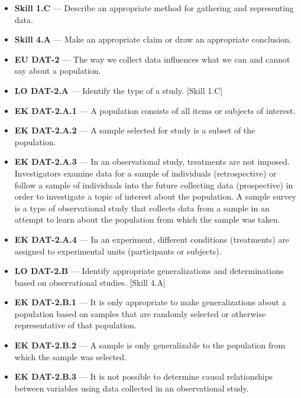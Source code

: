 \documentclass[11pt]{article}
\begin{document}


{\small
\begin{itemize}[leftmargin=1.5em,itemsep=2pt,topsep=2pt]
  \item \textbf{Skill 1.C} --- Describe an appropriate method for gathering and representing data.
  \item \textbf{Skill 4.A} --- Make an appropriate claim or draw an appropriate conclusion.
  \item \textbf{EU DAT-2} --- The way we collect data influences what we can and cannot say about a population.
  \item \textbf{LO DAT-2.A} --- Identify the type of a study. [Skill 1.C]
  \item \textbf{EK DAT-2.A.1} --- A population consists of all items or subjects of interest.
  \item \textbf{EK DAT-2.A.2} --- A sample selected for study is a subset of the population.
  \item \textbf{EK DAT-2.A.3} --- In an observational study, treatments are not imposed. Investigators examine data for a sample of individuals (retrospective) or follow a sample of individuals into the future collecting data (prospective) in order to investigate a topic of interest about the population. A sample survey is a type of observational study that collects data from a sample in an attempt to learn about the population from which the sample was taken.
  \item \textbf{EK DAT-2.A.4} --- In an experiment, different conditions (treatments) are assigned to experimental units (participants or subjects).
  \item \textbf{LO DAT-2.B} --- Identify appropriate generalizations and determinations based on observational studies. [Skill 4.A]
  \item \textbf{EK DAT-2.B.1} --- It is only appropriate to make generalizations about a population based on samples that are randomly selected or otherwise representative of that population.
  \item \textbf{EK DAT-2.B.2} --- A sample is only generalizable to the population from which the sample was selected.
  \item \textbf{EK DAT-2.B.3} --- It is not possible to determine causal relationships between variables using data collected in an observational study.
\end{itemize}
}
\end{document}

